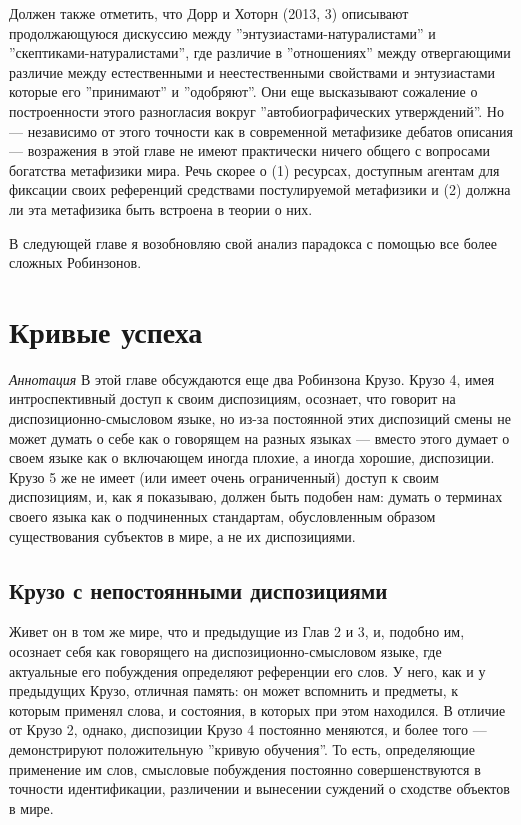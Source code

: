 \documentclass[11pt]{book}
\begin{document}
Должен также отметить, что Дорр и Хоторн (2013, 3) описывают продолжающуюся дискуссию между ''энтузиастами-натуралистами'' и ''скептиками-натуралистами'', где различие в ''отношениях'' между отвергающими различие между естественными и неестественными свойствами и энтузиастами которые его ''принимают'' и ''одобряют''. Они еще высказывают сожаление о построенности этого разногласия вокруг ''автобиографических утверждений''. Но --- независимо от этого точности как в современной метафизике дебатов описания --- возражения в этой главе не имеют практически ничего общего с вопросами богатства метафизики мира. Речь скорее о (1) ресурсах, доступным агентам для фиксации своих референций средствами постулируемой метафизики и (2) должна ли эта метафизика быть встроена в теории о них.

В следующей главе я возобновляю свой анализ парадокса с помощью все более сложных Робинзонов.

\chapter{Кривые успеха}

\qquad

\textit{Аннотация} \quad В этой главе обсуждаются еще два Робинзона Крузо. Крузо 4, имея интроспективный доступ к своим диспозициям, осознает, что говорит на диспозиционно-смысловом языке, но из-за постоянной этих диспозиций смены не может думать о себе как о говорящем на разных языках --- вместо этого думает о своем языке как о включающем иногда плохие, а иногда хорошие, диспозиции. Крузо 5 же не имеет (или имеет очень ограниченный) доступ к своим диспозициям, и, как я показываю, должен быть подобен нам: думать о терминах своего языка как о подчиненных стандартам, обусловленным образом существования субъектов в мире, а не их диспозициями.

\qquad

\section{Крузо с непостоянными диспозициями}

Живет он в том же мире, что и предыдущие из Глав 2 и 3, и, подобно им, осознает себя как говорящего на диспозиционно-смысловом языке, где актуальные его побуждения определяют референции его слов. У него, как и у предыдущих Крузо, отличная память: он может вспомнить и предметы, к которым применял слова, и состояния, в которых при этом находился. В отличие от Крузо 2, однако, диспозиции Крузо 4 постоянно меняются, и более того --- демонстрируют положительную ''кривую обучения''. То есть, определяющие применение им слов, смысловые побуждения постоянно совершенствуются в точности идентификации, различении и вынесении суждений о сходстве объектов в мире.
\end{document}
